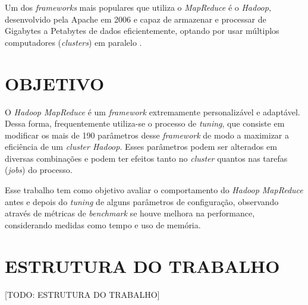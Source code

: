 Um dos \textit{\gls{framework}s} mais populares que utiliza o \textit{MapReduce} é o \textit{Hadoop}, desenvolvido pela Apache em 2006 e capaz de armazenar e processar de Gigabytes a Petabytes de dados eficientemente, optando por usar múltiplos computadores (\textit{clusters}) em paralelo \cite{HadoopBook15}.

\section{OBJETIVO} \label{sec:objetivo}

O \textit{Hadoop MapReduce} é um \textit{\gls{framework}} extremamente personalizável e adaptável. Dessa forma, frequentemente utiliza-se o processo de \textit{tuning}, que consiste em modificar os mais de 190 parâmetros desse \textit{\gls{framework}} de modo a maximizar a eficiência de um \textit{cluster Hadoop}. Esses parâmetros podem ser alterados em diversas combinações e podem ter efeitos tanto no \textit{cluster} quantos nas tarefas (\textit{jobs}) do processo.

Esse trabalho tem como objetivo avaliar o comportamento do \textit{Hadoop MapReduce} antes e depois do \textit{tuning} de alguns parâmetros de configuração, observando através de métricas de \textit{benchmark} se houve melhora na performance, considerando medidas como tempo e uso de memória.

\section{ESTRUTURA DO TRABALHO} \label{sec:estrtura}

[TODO: ESTRUTURA DO TRABALHO]